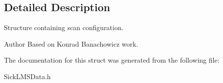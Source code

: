 \subsection{Detailed Description}
Structure containing scan configuration. 

\begin{DoxyAuthor}{Author}
Based on Konrad Banachowicz work. 
\end{DoxyAuthor}


The documentation for this struct was generated from the following file\-:\begin{DoxyCompactItemize}
\item 
Sick\-L\-M\-S\-Data.\-h\end{DoxyCompactItemize}
